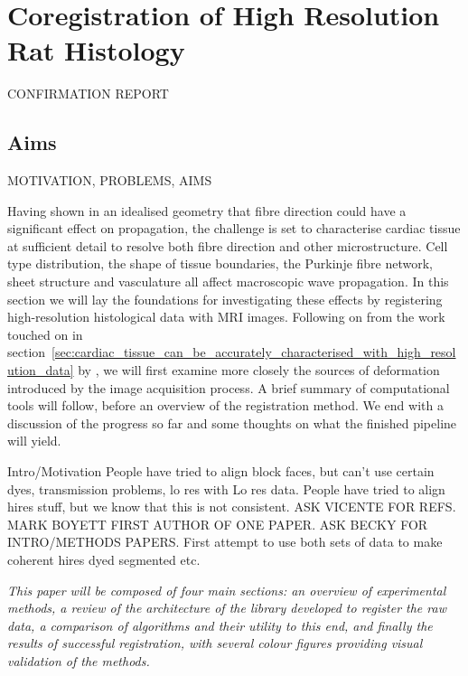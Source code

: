 \chapter{Coregistration of High Resolution Rat Histology}
\dblspace
\begin{quote}{\em }\end{quote}

CONFIRMATION REPORT
\section{Aims}
  MOTIVATION, PROBLEMS, AIMS
  
  Having shown in an idealised geometry that fibre direction could have a significant effect on propagation, the challenge is set to characterise cardiac tissue at sufficient detail to resolve both fibre direction and other microstructure. Cell type distribution, the shape of tissue boundaries, the Purkinje fibre network, sheet structure and vasculature all affect macroscopic wave propagation. In this section we will lay the foundations for investigating these effects by registering high-resolution histological data with MRI images. Following on from the work touched on in section~\ref{sec:cardiac_tissue_can_be_accurately_characterised_with_high_resolution_data} by \cite{Mansoori2007}, we will first examine more closely the sources of deformation introduced by the image acquisition process. A brief summary of computational tools will follow, before an overview of the registration method. We end with a discussion of the progress so far and some thoughts on what the finished pipeline will yield.
  
  
  
  Intro/Motivation
  People have tried to align block faces, but can't use certain dyes, transmission problems, lo res with Lo res data.
  People have tried to align hires stuff, but we know that this is not consistent.
  ASK VICENTE FOR REFS. MARK BOYETT FIRST AUTHOR OF ONE PAPER. ASK BECKY FOR INTRO/METHODS PAPERS.
  First attempt to use both sets of data to make coherent hires dyed segmented etc.
  
  \emph{This paper will be composed of four main sections: an overview of experimental methods, a review of the architecture of the library developed to register the raw data, a comparison of algorithms and their utility to this end, and finally the results of successful registration, with several colour figures providing visual validation of the methods.}
  
